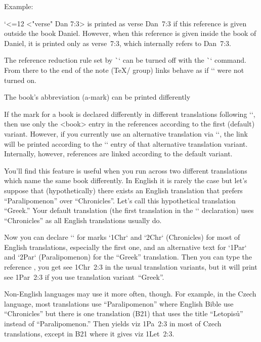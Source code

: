 {{Example:

\begtt \catcode`<=12
\re<"verse" Dan 7:3>
\endtt
is printed as {\Blue verse Dan~7:3} if this reference is given outside the book
Daniel. However, when this reference is given inside the book of Daniel, it is printed
only as {\Blue verse~7:3}, which internally refers to Dan~7:3. 

The reference reduction rule set by \`\reduceref` can be turned off 
with the \`\noreduceref` command. From there to the end of the note (\TeX/ group)
links behave as if `\reduceref` were not turned on.




\secc[knihajinak] The book's abbreviation (a-mark) can be printed differently

If the mark for a book is declared differently in different translations following
`\vdef`, then use only the <book> entry in the references according to the first (default)
variant. However, if you currently use an  alternative translation via `\tmark`, 
the link will be printed according to the `\vdef` entry of that alternative translation variant.
Internally, however, references are linked according to the default variant.

You'll find this feature is useful when you run across two different translations 
which name the same book differently.
In English it is rarely the case but let's suppose that (hypothetically) there exists an English 
translation that prefers “Paralipomenon” over “Chronicles”. Let's call this hypothetical 
translation “Greek.”
Your default translation (the first translation in the `\variants` declaration)
uses “Chronicles” as all English translations usually do. 

Now  you can declare `\vdef` for marks `1Chr` and `2Chr` (Chronicles) for most of English 
translations, especially the first one, and an alternative text for `1Par` and `2Par` 
(Paralipomenon) for the “Greek” translation. 
Then you can type the reference , you get {\Blue see 1Chr~2:3} in the usual
translation variants, but it will print {\Blue see 1Par~2:3} if you use
translation variant~“Greek”.

Non-English languages may use it more often, though. 
For example, in the Czech language, most translations 
use “Paralipomenon” where English Bible use “Chronicles” but there is one translation (B21) that uses 
the title “Letopisů” instead of “Paralipomenon.” Then  yields  {\Blue viz 1Pa~2:3} in most of Czech translations, except in B21 where it gives {\Blue viz 1Let~2:3}.

}}
